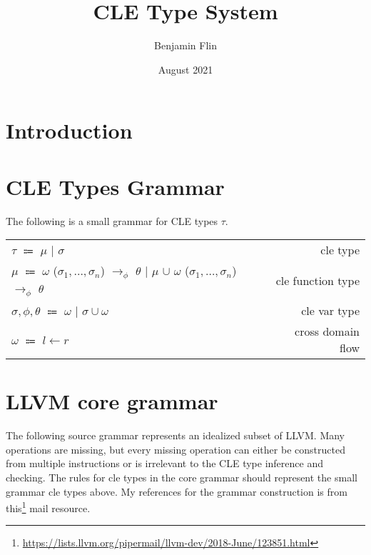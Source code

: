 \documentclass{article}
\title{CLE Type System}
\author{Benjamin Flin}
\date{August 2021}
\begin{document}
\maketitle

\section{Introduction}
\section{CLE Types Grammar}
The following is a small grammar for CLE types $\tau$.  

\begin{center}
\begin{tabular}{ l r }
    $\tau$ $\Coloneqq$ $\mu$ $\mid$ $\sigma$
    & cle type \\ 
    $\mu$ $\Coloneqq$ $\omega$ ($\sigma_1, \dots, \sigma_n$) $\rightarrow_\phi$ $\theta$ $\mid$ $\mu$ $\cup$ $\omega$ ($\sigma_1, \dots, \sigma_n$) $\rightarrow_\phi$ $\theta$    
    & cle function type \\
    $\sigma, \phi, \theta$ $\Coloneqq$ $\omega$ $\mid$ $\sigma \cup \omega$ 
    & cle var type \\
    $\omega$ $\Coloneqq$ $l \leftarrow r$ & cross domain flow
\end{tabular}
\end{center}

\section{LLVM core grammar}
The following source grammar represents an idealized subset of LLVM. 
Many operations are missing, but every missing operation can either be constructed from multiple instructions or is irrelevant to the CLE type inference and checking. 
The rules for cle types in the core grammar should represent the small grammar cle types above.
My references for the grammar construction is from this\footnote{\url{https://lists.llvm.org/pipermail/llvm-dev/2018-June/123851.html}} mail resource.
\end{document}
